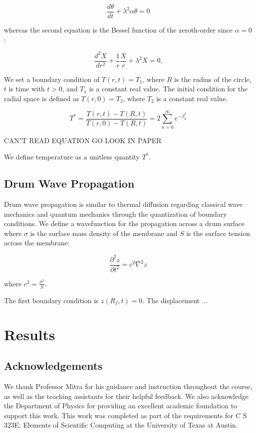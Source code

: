 \documentclass[linenumbers, RNAAS, trackchanges]{aastex631}
\begin{document}
\begin{equation}
    \frac{d\theta}{dt}+\lambda^2\alpha\theta=0
\end{equation}

\noindent whereas the second equation is the Bessel function of the zeroth-order
since $\alpha=0$:

\begin{equation}
    \frac{d^2X}{dr^2}+\frac{1}{r}\frac{X}{r}+\lambda^2X=0.
\end{equation}

We set a boundary condition of $T(r,t)=T_1$, where $R$ is the radius of the circle,
$t$ is time with $t>0$, and $T_1$ is a constant real value. The initial condition for
the radial space is defined as $T(r,0)=T_2$, where $T_2$ is a constant real value.

\begin{equation}
    T^*=\frac{T(r,t)-T(R,t)}{T(r,0)-T(R,t)}=2\sum_{n=0}^\infty e^{-\beta_{n}^2}
\end{equation}

CAN"T READ EQUATION GO LOOK IN PAPER

\noindent We define temperature as a unitless quantity $T^*$. 

\subsection{Drum Wave Propagation}

Drum wave propagation is similar to thermal diffusion regarding classical wave 
mechanics and quantum mechanics through the quantization of boundary conditions.
We define a wavefunction for the propagation across a drum surface where $\sigma$
is the surface mass density of the membrane and $S$ is the surface tension
across the membrane:

\begin{equation}
    \frac{\partial^2z}{\partial t^2}=c^2\nabla^2z
\end{equation}

\noindent where $c^2=\frac{\sigma^2}{S}$.

The first boundary condition is $z(R_f,t)=0$. The displacement ...

\section{Results} \label{sec:results}



\subsection{Acknowledgements}
We thank Professor Mitra for his guidance and instruction throughout the course,
as well as the teaching assistants for their helpful feedback. We also
acknowledge the Department of Physics for providing an excellent academic foundation 
to support this work. This work was completed as part of the requirements for 
C S 323E: Elements of Scientific Computing at the University of Texas at Austin.

\newpage


\end{document}
